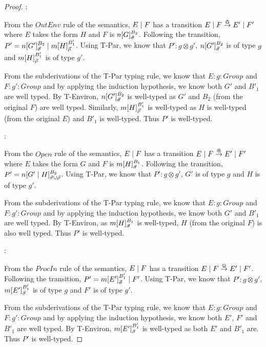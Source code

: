 \begin{proof}
:

\noindent From the $OutEnv$ rule of the semantics, $E \;|\; F$ has a
transition $E \;|\; F \stackrel{\varowedge}{\rightarrow} E' \;|\; F'$ where $E$ takes the
form $H$ and $F$ is ${n}[ G ]^{B_2}_{\vec{\sigma}}$.  Following the
transition, \linebreak $P' = {n}[ G' ]^{B_2}_{\vec{\sigma}} \;|\;
{m}[ H ]^{B'_1}_{\vec{\rho}}$.  Using T-Par, we know that $P' : g
\otimes g'$, ${n}[ G' ]^{B_2}_{\vec{\sigma}}$ is of type $g$ and
${m}[ H ]^{B'_1}_{\vec{\rho}}$ is of type $g'$.

From the subderivations of the T-Par typing rule, we know that $E :
g : Group$ and $F : g' : Group$ and by applying the induction
hypothesis, we know both $G'$ and $B'_1$ are well typed.  By
T-Environ, ${n}[ G' ]^{B_2}_{\vec{\sigma}}$ is well-typed as $G'$
and $B_2$ (from the original $F$) are well typed.  Similarly,
${m}[ H ]^{B'_1}_{\vec{\rho}}$ is well-typed as $H$ is well-typed
(from the original $E$) and $B'_1$ is well-typed.  Thus $P'$ is
well-typed.

:

\noindent From the $Open$ rule of the semantics, $E \;|\; F$ has a
transition $E \;|\; F \stackrel{\varoast}{\rightarrow} E' \;|\; F'$ where $E$ takes the
form $G$ and $F$ is ${m}[ H ]^{B_1}_{\vec{\sigma}}$.  Following the
transition, $P' = {n}[ G' \;|\; H ]^{B_2}_{\vec{\sigma} \cup
  \vec{\rho}}$.  Using T-Par, we know that $P' : g \otimes g'$, $G'$
is of type $g$ and $H$ is of type $g'$.

From the subderivations of the T-Par typing rule, we know that $E : g
: Group$ and $F : g' : Group$ and by applying the induction
hypothesis, we know both $G'$ and $B'_1$ are well typed.  By
T-Environ, as ${m}[ H ]^{B_1}_{\vec{\sigma}}$ is well-typed, $H$
(from the original $F$) is also well typed. Thus $P'$ is
well-typed.

:

\noindent From the $ProcIn$ rule of the semantics, $E \;|\; F$ has a
transition $E \;|\; F \stackrel{\varovee}{\rightarrow} E' \;|\; F'$.  Following the
transition, $P' = {m}[ E' ]^{B'_1}_{\vec{\sigma}} \;|\; F'$.  Using
T-Par, we know that $P' : g \otimes g'$,
${m}[ E' ]^{B'_1}_{\vec{\sigma}}$ is of type $g$ and $F'$ is of type
$g'$.

From the subderivations of the T-Par typing rule, we know that $E : g
: Group$ and $F : g' : Group$ and by applying the induction
hypothesis, we know both $E'$, $F'$ and $B'_1$ are well typed.  By
T-Environ, ${m}[ E' ]^{B'_1}_{\vec{\sigma}}$ is well-typed as both
$E'$ and $B'_1$ are.  Thus $P'$ is well-typed.


\end{proof}
